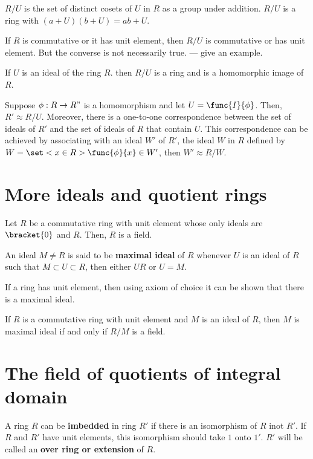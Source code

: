 \(R/U\) is the set of distinct cosets of \(U\) in \(R\) as a group under addition. \(R/U\) is a ring with \((a + U)(b + U) = ab + U\).

If \(R\) is commutative or it has unit element, then \(R/U\) is commutative or has unit element. But the converse is not necessarily true.
--- give an example.

\begin{lemma}
    If \(U\) is an ideal of the ring \(R\). then \(R/U\) is a ring and is a homomorphic image of \(R\).
\end{lemma}

\begin{theorem}
    Suppose \(\phi:R \to R"\) is a homomorphism and let \(U = \func{I}{\phi}\). Then, \(R' \approx R/U\). Moreover, there is a one-to-one correspondence between the set of ideals of \(R'\) and the set of ideals of \(R\) that contain \(U\). This correspondence can be achieved by associating with an ideal \(W'\) of \(R'\), the ideal \(W \) in \(R\) defined by \(W = \set<x \in R>{\func{\phi}{x} \in W'}\), then \(W' \approx R/W\).
\end{theorem}
\section{More ideals and quotient rings}
\begin{lemma}
    Let \(R\) be a commutative ring with unit element whose only ideals are \(\bracket{0}\) and \(R\). Then, \(R\) is a field.
\end{lemma}

\begin{definition}
    An ideal \(M \neq R\) is said to be \textbf{maximal ideal} of \(R\) whenever \(U\) is an ideal of \(R\) such that \(M \subset U \subset R\), then either \(U R\) or \(U = M\).
\end{definition}

If a ring has unit element, then using axiom of choice it can be shown that there is a maximal ideal.

\begin{theorem}
    If \(R\) is a commutative ring with unit element and \(M\) is an ideal of \(R\), then \(M\) is maximal ideal if and only if \(R/M\) is a field.
\end{theorem}

\section{The field of quotients of integral domain}
\begin{definition}
    A ring \(R\) can be \textbf{imbedded} in ring \(R'\) if there is an isomorphism of \(R\) inot \(R'\). If \(R\) and \(R'\) have unit elements, this isomorphism should take \(1\) onto \(1'\). \(R'\) will be called an \textbf{over ring or extension } of \(R\).
\end{definition}

